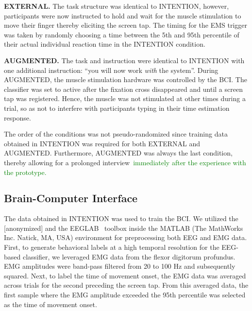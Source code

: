 \indent\textbf{EXTERNAL.} The task structure was identical to INTENTION, however, participants were now instructed to hold and wait for the muscle stimulation to move their finger thereby eliciting the screen tap. The timing for the EMS trigger was taken by randomly choosing a time between the 5th and 95th percentile of their actual individual reaction time in the INTENTION condition. 

\indent\textbf{AUGMENTED.} The task and instruction were identical to INTENTION with one additional instruction: ``you will now work \textit{with} the system''. During AUGMENTED, the muscle stimulation hardware was controlled by the BCI. The classifier was set to active after the fixation cross disappeared and until a screen tap was registered. Hence, the muscle was not stimulated at other times during a trial, so as not to interfere with participants typing in their time estimation response.

The order of the conditions was not pseudo-randomized since training data obtained in INTENTION was required for both EXTERNAL and AUGMENTED. Furthermore, AUGMENTED was always the last condition, thereby allowing for a prolonged interview~\textcolor{green}{immediately after the experience with the prototype.}

\subsection{Brain-Computer Interface}\label{BCI}
The data obtained in INTENTION was used to train the BCI. We utilized the [anonymized] and the EEGLAB~\cite{Delorme2004-sn} toolbox inside the MATLAB (The MathWorks Inc. Natick, MA, USA) environment for preprocessing both EEG and EMG data. First, to generate behavioral labels at a high temporal resolution for the EEG-based classifier, we leveraged EMG data from the flexor digitorum profundus. EMG amplitudes were band-pass filtered from 20 to 100 Hz and subsequently squared. Next, to label the time of movement onset, the EMG data was averaged across trials for the second preceding the screen tap. From this averaged data, the first sample where the EMG amplitude exceeded the 95th percentile was selected as the time of movement onset.


